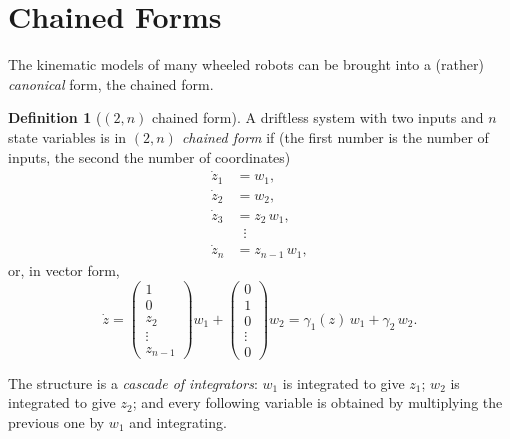 \documentclass[11pt,a4paper]{article}
\def\bm#1{#1}%
\def\boldsymbol#1{#1}%
\newcommand{\zv}{\bm{z}}
\newcommand{\z}{\boldsymbol{z}}
\theoremstyle{definition}
\newtheorem{definition}{Definition}[section]
\theoremstyle{plain}
\theoremstyle{remark}
\begin{document}
\section{Chained Forms}

The kinematic models of many wheeled robots can be brought into a (rather) \emph{canonical} form, the chained form.

\begin{definition}[$(2,n)$ chained form]\label{def:chained}
A driftless system with two inputs and $n$ state variables is in \emph{$(2,n)$ chained form} if (the first number is the number of inputs, the second the number of coordinates)
\begin{align*}
  \dot z_1 &= w_1,\\
  \dot z_2 &= w_2,\\
  \dot z_3 &= z_2\,w_1,\\
  &\;\;\vdots\\
  \dot z_n &= z_{n-1}\,w_1 ,
\end{align*}
or, in vector form,
\[
  \dot{\zv}=\begin{pmatrix}1\\0\\z_2\\\vdots\\z_{n-1}\end{pmatrix}w_1+\begin{pmatrix}0\\1\\0\\\vdots\\0\end{pmatrix}w_2
  = \bm{\gamma}_1(\zv)\,w_1+\bm{\gamma}_2\,w_2 .
\]
\end{definition}

The structure is a \emph{cascade of integrators}: $w_1$ is integrated to give $z_1$; $w_2$ is integrated to give $z_2$; and every following variable is obtained by multiplying the previous one by $w_1$ and integrating.
\end{document}
